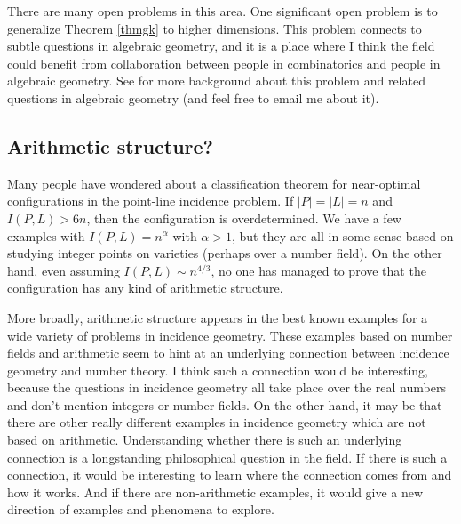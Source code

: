 \documentclass{amsart}
\begin{document}
There are many open problems in this area.  One significant open problem is to generalize Theorem \ref{thmgk} to higher dimensions.  This problem connects to subtle questions in algebraic geometry, and it is a place where I think the field could benefit from collaboration between people in combinatorics and people in algebraic geometry.  See \cite{Gu} for more background about this problem and related questions in algebraic geometry (and feel free to email me about it).

\subsection{Arithmetic structure?}

Many people have wondered about a classification theorem for near-optimal configurations in the point-line incidence problem.  If $|P| = |L| = n$ and $I(P,L) > 6n$, then the configuration is overdetermined.  We have a few examples with $I(P,L) = n^\alpha$ with $\alpha > 1$, but they are all in some sense based on studying integer points on varieties (perhaps over a number field).  On the other hand, even assuming $I(P,L) \sim n^{4/3}$, no one has managed to prove that the configuration has any kind of arithmetic structure.

More broadly, arithmetic structure appears in the best known examples for a wide variety of problems in incidence geometry.  
These examples based on number fields and arithmetic seem to hint at an underlying connection between incidence geometry and number theory.  I think such a connection would be interesting, because the questions in incidence geometry all take place over the real numbers and don't mention integers or number fields.  On the other hand, it may be that there are other really different examples in incidence geometry which are not based on arithmetic.   Understanding whether there is such an underlying connection is a longstanding philosophical question in the field.  If there is such a connection, it would be interesting to learn where the connection comes from and how it works.  And if there are non-arithmetic examples, it would give a new direction of examples and phenomena to explore.
\end{document}
